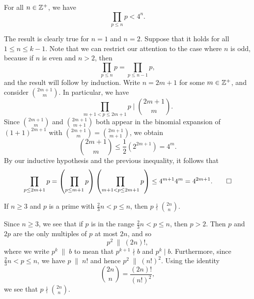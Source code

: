 \begin{prop}
For all $n \in \mathbb{Z}^+$, we have 
\[ \prod_{p\leq n} p < 4^n. \]
\end{prop}
\begin{pf}
The result is clearly true for $n = 1$ and $n = 2$. Suppose that it holds for all $1 \leq n \leq k-1$. 
Note that we can restrict our attention to the case where $n$ is odd, because if $n$ is even 
and $n > 2$, then 
\[ \prod_{p \leq n} p = \prod_{p \leq n-1} p, \]
and the result will follow by induction. Write $n = 2m+1$ for some $m \in \mathbb{Z}^+$, and consider 
$\binom{2m+1}m$. In particular, we have 
\[ \prod_{m+1<p\leq2m+1} p \; \bigg\rvert \; \binom{2m+1}m. \]
Since $\binom{2m+1}m$ and $\binom{2m+1}{m+1}$ both appear in the binomial expansion of $(1+1)^{2m+1}$
with $\binom{2m+1}m = \binom{2m+1}{m+1}$, we obtain 
\[ \binom{2m+1}m \leq \frac12 (2^{2m+1}) = 4^m. \]
By our inductive hypothesis and the previous inequality, it follows that 
\[ \prod_{p\leq 2m+1} p = \left( \prod_{p\leq m+1} p \right) \left( \prod_{m+1 < p\leq 2m+1} p \right)
\leq 4^{m+1} 4^m = 4^{2m+1}. \qedhere \]
\end{pf}

\begin{lemma}
If $n \geq 3$ and $p$ is a prime with $\frac23n < p \leq n$, then $p \nmid \binom{2n}n$. 
\end{lemma}
\begin{pf}
Since $n \geq 3$, we see that if $p$ is in the range $\frac23n < p \leq n$, then $p > 2$. Then 
$p$ and $2p$ are the only multiples of $p$ at most $2n$, and so 
\[ p^2 \; \| \; (2n)!, \]
where we write $p^k \; \| \; b$ to mean that $p^{k+1} \nmid b$ and $p^k \mid b$. Furthermore, since 
$\frac23n < p \leq n$, we have $p \;\|\; n!$ and hence $p^2 \;\|\; (n!)^2$. Using the identity 
\[ \binom{2n}n = \frac{(2n)!}{(n!)^2}, \] we see that $p \nmid \binom{2n}n$. 
\end{pf}

